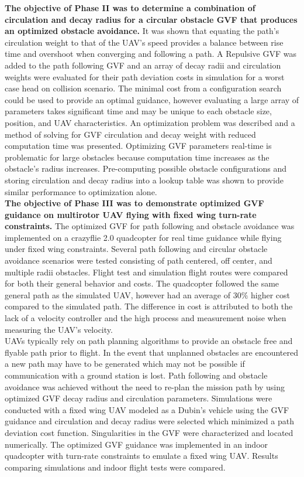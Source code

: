 \documentclass[numbered,pdftex]{ohio-etd}
\begin{document}
\textbf{The objective of Phase II was to determine a combination of circulation and decay radius for a circular obstacle GVF that produces an optimized obstacle avoidance.} It was shown that equating the path’s circulation weight to that of the UAV’s speed provides a balance between rise time and overshoot when converging and following a path. A Repulsive GVF was added to the path following GVF and an array of decay radii and circulation weights were evaluated for their path deviation costs in simulation for a worst case head on collision scenario. The minimal cost from a configuration search could be used to provide an optimal guidance, however evaluating a large array of parameters takes significant time and may be unique to each obstacle size, position, and UAV characteristics. An optimization problem was described and a method of solving for GVF circulation and decay weight with reduced computation time was presented. Optimizing GVF parameters real-time is problematic for large obstacles because computation time increases as the obstacle's radius increases. Pre-computing possible obstacle configurations and storing circulation and decay radius into a lookup table was shown to provide similar performance to optimization alone.\\

\textbf{The objective of Phase III was to demonstrate optimized GVF guidance on multirotor UAV flying with fixed wing turn-rate constraints.} The optimized GVF for path following and obstacle avoidance was implemented on a crazyflie 2.0 quadcopter for real time guidance while flying under fixed wing constraints. Several path following and circular obstacle avoidance scenarios were tested consisting of path centered, off center, and multiple radii obstacles. Flight test and simulation flight routes were compared for both their general behavior and costs. The quadcopter followed the same general path as the simulated UAV, however had an average of $30 \%$ higher cost compared to the simulated path. The difference in cost is attributed to both the lack of a velocity controller and the high process and measurement noise when measuring the UAV’s velocity.  \\


UAVs typically rely on path planning algorithms to provide an obstacle free and flyable path prior to flight. In the event that unplanned obstacles are encountered a new path may have to be generated which may not be possible if communication with a ground station is lost. Path following and obstacle avoidance was achieved without the need to re-plan the mission path by using optimized GVF decay radius and circulation parameters. Simulations were conducted with a fixed wing UAV modeled as a Dubin's vehicle using the GVF guidance and circulation and decay radius were selected which minimized a path deviation cost function. Singularities in the GVF were characterized and located numerically. The optimized GVF guidance was implemented in an indoor quadcopter with turn-rate constraints to emulate a fixed wing UAV. Results comparing simulations and indoor flight tests were compared. \\
\end{document}
